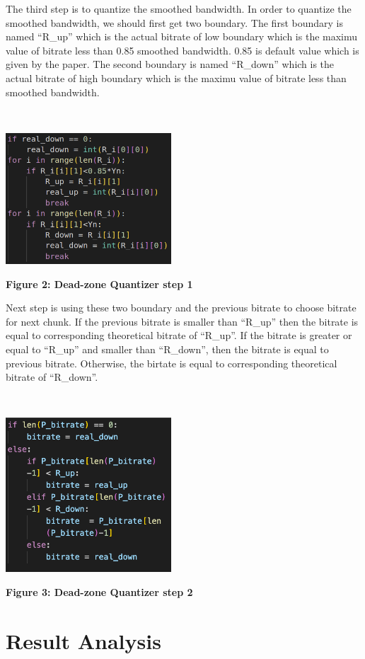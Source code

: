 The third step is to quantize the smoothed bandwidth. In order to quantize the smoothed bandwidth, we should first get two boundary. The first boundary is named “R\_up” which is the actual bitrate of low boundary which is the maximu value of bitrate less than 0.85 smoothed bandwidth. 0.85 is default value which is given by the paper. The second boundary is named “R\_down” which is the actual bitrate of high boundary which is the maximu value of bitrate less than smoothed bandwidth.

~\\
\centerline {\includegraphics[scale = 1, width=6.2cm]{quan1}}
\centerline{\textbf {Figure 2: Dead-zone Quantizer step 1}}

Next step is using these two boundary and the previous bitrate to choose bitrate for next chunk. If the previous bitrate is smaller than “R\_up” then the bitrate is equal to corresponding theoretical bitrate of “R\_up”. If the bitrate is greater or equal to “R\_up” and smaller than “R\_down”, then the bitrate is equal to previous bitrate. Otherwise, the birtate is equal to corresponding theoretical bitrate of “R\_down”.

~\\
\centerline {\includegraphics[scale = 1, width=6.2cm]{quan2}}
\centerline{\textbf {Figure 3: Dead-zone Quantizer step 2}}

\section{Result Analysis}

